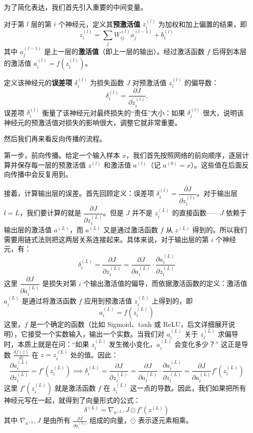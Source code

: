 \documentclass[lang=cn,zihao=-4,a4paper,fontset=windows]{beautybook}
\renewcommand{\partial}{∂}
\begin{document}
为了简化表达，我们首先引入重要的中间变量。

\begin{definition}
对于第 $l$ 层的第 $i$ 个神经元，定义其\textbf{预激活值} $z_i^{(l)}$ 为加权和加上偏置的结果，即 \[z_i^{(l)} = \sum_j W_{ij}^{(l)} a_j^{(l-1)} + b_i^{(l)}\]其中 $a_j^{(l-1)}$ 是上一层的\textbf{激活值}（即上一层的输出）。经过激活函数 $f$ 后得到本层的激活值 $a_i^{(l)} = f(z_i^{(l)})$。

定义该神经元的\textbf{误差项} $\delta_i^{(l)}$ 为损失函数 $J$ 对预激活值 $z_i^{(l)}$ 的偏导数：
\[\delta_i^{(l)} = \frac{\partial J}{\partial z_i^{(l)}}.\]
误差项 $\delta_i^{(l)}$ 衡量了该神经元对最终损失的“责任”大小：如果 $\delta_i^{(l)}$ 很大，说明该神经元的预激活值对损失的影响很大，调整它就非常重要。
\end{definition}

然后我们再来看反向传播的流程。

第一步，前向传播。给定一个输入样本 $x$，我们首先按照网络的前向顺序，逐层计算并保存每一层的预激活值 $z^{(l)}$ 和激活值 $a^{(l)}$（记 $a^{(0)} = x$）。这些值在后面反向传播中会反复用到。

接着，计算输出层的误差。首先回顾定义：误差项 $\delta_i^{(l)} = \dfrac{\partial J}{\partial z_i^{(l)}}$。对于输出层 $l = L$，我们要计算的就是 $\dfrac{\partial J}{\partial z_i^{(L)}}$。但是 $J$ 并不是 $z_i^{(L)}$ 的直接函数——$J$ 依赖于输出层的激活值 $a^{(L)}$，而 $a^{(L)}$ 又是通过激活函数 $f$ 从 $z^{(L)}$ 得到的。所以我们需要用链式法则把这两层关系连接起来。具体来说，对于输出层的第 $i$ 个神经元，有：
\[\delta_i^{(L)} = \frac{\partial J}{\partial z_i^{(L)}} = \frac{\partial J}{\partial a_i^{(L)}} \cdot \frac{\partial a_i^{(L)}}{\partial z_i^{(L)}}\]
这里 $\dfrac{\partial J}{\partial a_i^{(L)}}$ 是损失对第 $i$ 个输出激活值的偏导，而依据激活函数的定义：激活值 $a_i^{(L)}$ 是通过将激活函数 $f$ 应用到预激活值 $z_i^{(L)}$ 上得到的，即
\[a_i^{(L)} = f(z_i^{(L)})\]
这里，$f$ 是一个确定的函数（比如 Sigmoid、tanh 或 ReLU，后文详细展开说明），它接受一个实数输入，输出一个实数。当我们对 $a_i^{(L)}$ 关于 $z_i^{(L)}$ 求偏导时，本质上就是在问：“如果 $z_i^{(L)}$ 发生微小变化，$a_i^{(L)}$ 会变化多少？” 这正是导数 $\frac{d f(z)}{dz}$ 在 $z = z_i^{(L)}$ 处的值。因此：
\[\frac{\partial a_i^{(L)}}{\partial z_i^{(L)}} = f'(z_i^{(L)})\implies \delta_i^{(L)} = \frac{\partial J}{\partial z_i^{(L)}} = \frac{\partial J}{\partial a_i^{(L)}} \cdot \frac{\partial a_i^{(L)}}{\partial z_i^{(L)}}=\frac{\partial J}{\partial a_i^{(L)}}  f'(z_i^{(L)})\]
这里 $f'(z_i^{(L)})$ 就是激活函数 $f$ 在 $z_i^{(L)}$ 这一点的导数。因此，我们如果把所有神经元写在一起，就得到了向量形式的公式：
\[\delta^{(L)} = \nabla_{a^{(L)}} J \odot f'(z^{(L)})\]
其中 $\nabla_{a^{(L)}} J$ 是由所有 $\frac{\partial J}{\partial a_i^{(L)}}$ 组成的向量，$\odot$ 表示逐元素相乘。
\end{document}
